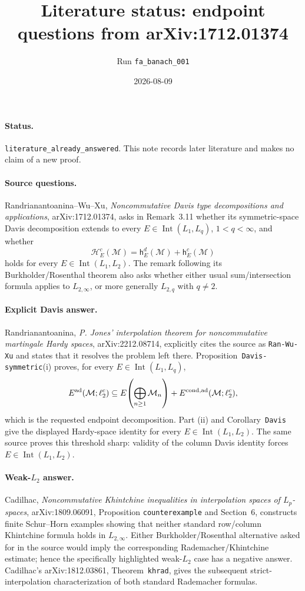 \documentclass[11pt]{article}
\title{Literature status: endpoint questions from arXiv:1712.01374}
\author{Run \texttt{fa\_banach\_001}}
\date{2026-08-09}
\newcommand{\M}{\mathcal M}
\newcommand{\Hc}{\mathcal H}
\newcommand{\hc}{\mathsf h}
\newcommand{\Int}{\operatorname{Int}}
\begin{document}
\maketitle

\paragraph{Status.}
\texttt{literature\_already\_answered}.  This note records later literature
and makes no claim of a new proof.

\paragraph{Source questions.}
Randrianantoanina--Wu--Xu,
\emph{Noncommutative Davis type decompositions and applications},
arXiv:1712.01374, asks in Remark~3.11 whether its symmetric-space Davis
decomposition extends to every
\(E\in\Int(L_1,L_q)\), \(1<q<\infty\), and whether
\[
  \Hc_E^c(\M)=\hc_E^d(\M)+\hc_E^c(\M)
\]
holds for every \(E\in\Int(L_1,L_2)\).  The remark following its
Burkholder/Rosenthal theorem also asks whether either usual sum/intersection
formula applies to \(L_{2,\infty}\), or more generally \(L_{2,q}\) with
\(q\ne2\).

\paragraph{Explicit Davis answer.}
Randrianantoanina, \emph{P. Jones' interpolation theorem for noncommutative
martingale Hardy spaces}, arXiv:2212.08714, explicitly cites the source as
\texttt{Ran-Wu-Xu} and states that it resolves the problem left there.
Proposition~\texttt{Davis-symmetric}(i) proves, for every
\(E\in\Int(L_1,L_q)\),
\[
 E^{\rm ad}(\M;\ell_2^c)
 \subseteq
 E\!\left(\bigoplus_{n\ge1}\M_n\right)
 +E^{\rm cond,ad}(\M;\ell_2^c),
\]
which is the requested endpoint decomposition.  Part (ii) and
Corollary~\texttt{Davis} give the displayed Hardy-space identity for every
\(E\in\Int(L_1,L_2)\).  The same source proves this threshold sharp: validity
of the column Davis identity forces \(E\in\Int(L_1,L_2)\).

\paragraph{Weak-\(L_2\) answer.}
Cadilhac, \emph{Noncommutative Khintchine inequalities in interpolation
spaces of \(L_p\)-spaces}, arXiv:1809.06091, Proposition
\texttt{counterexample} and Section~6, constructs finite Schur--Horn examples
showing that neither standard row/column Khintchine formula holds in
\(L_{2,\infty}\).  Either Burkholder/Rosenthal alternative asked for in the
source would imply the corresponding Rademacher/Khintchine estimate; hence
the specifically highlighted weak-\(L_2\) case has a negative answer.
Cadilhac's arXiv:1812.03861, Theorem~\texttt{khrad}, gives the subsequent
strict-interpolation characterization of both standard Rademacher formulas.
\end{document}
